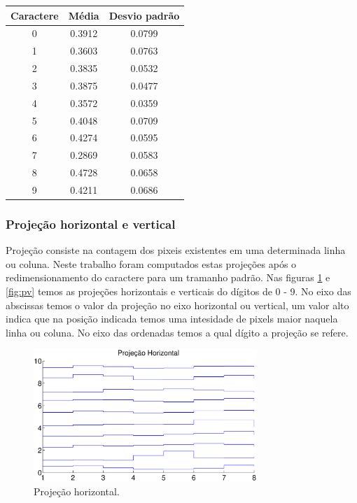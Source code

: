 \documentclass[letterpaper, 10 pt, conference]{ieeeconf}  %
\begin{document}
\begin{table}[h]
\centering
\begin{tabular}{|c|c|c|}
\hline
Caractere & Média  & Desvio padrão \\ \hline
0         & 0.3912 & 0.0799        \\ \hline
1         & 0.3603 & 0.0763        \\ \hline
2         & 0.3835 & 0.0532        \\ \hline
3         & 0.3875 & 0.0477        \\ \hline
4         & 0.3572 & 0.0359        \\ \hline
5         & 0.4048 & 0.0709        \\ \hline
6         & 0.4274 & 0.0595        \\ \hline
7         & 0.2869 & 0.0583        \\ \hline
8         & 0.4728 & 0.0658        \\ \hline
9         & 0.4211 & 0.0686        \\ \hline
\end{tabular}
\end{table}



\subsubsection{Projeção horizontal e vertical}
Projeção consiste na contagem dos pixeis existentes em uma determinada linha ou
coluna. Neste trabalho foram computados estas projeções após o redimensionamento
do caractere para um tramanho padrão. Nas figuras \ref{fig:ph} e \ref{fig:pv}
temos as projeções horizontais e verticais do dígitos de 0 - 9. No eixo das
abscissas temos o valor da projeção no eixo horizontal ou vertical, um valor
alto indica que na posição indicada temos uma intesidade de pixels maior naquela
linha ou coluna. No eixo das ordenadas temos a qual dígito a projeção se refere.


\begin{figure}[H]
\centering

\includegraphics[height=5cm]{imagens/projecaoHorizontal.eps}

\caption{Projeção horizontal.}
\label{fig:ph}
\end{figure}
\end{document}
